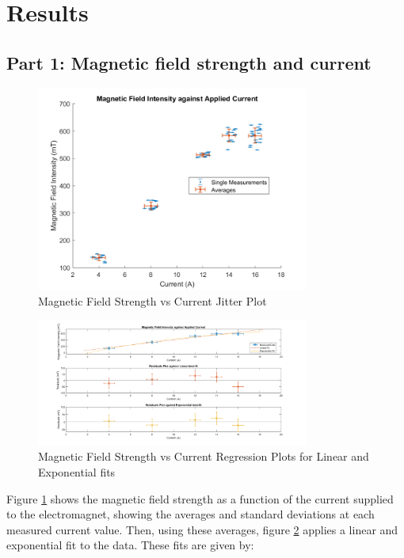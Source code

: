 

\section{Results}



\subsection{Part 1: Magnetic field strength and current}

\begin{figure}
    \centering
    \includegraphics[width=0.8\textwidth]{Results/Figures/Magnetic_Field_vs_Current_jitter.png}
    \caption{Magnetic Field Strength vs Current Jitter Plot}
    \label{fig:magnetic_field_vs_current_jitter}
\end{figure}
\begin{figure}
    \centering
    \includegraphics[width=0.8\textwidth]{Results/Figures/Magnetic_Field_vs_Current.png}
    \caption{Magnetic Field Strength vs Current Regression Plots for Linear and Exponential fits}
    \label{fig:magnetic_field_vs_current}
\end{figure}
Figure \ref{fig:magnetic_field_vs_current_jitter} shows the magnetic field strength as a function of the current supplied to the electromagnet, showing the averages and standard deviations at each measured current value. Then, using these averages, figure \ref{fig:magnetic_field_vs_current} applies a linear and exponential fit to the data. These fits are given by:
